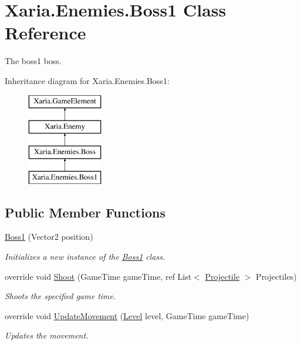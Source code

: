 \hypertarget{classXaria_1_1Enemies_1_1Boss1}{}\section{Xaria.\+Enemies.\+Boss1 Class Reference}
\label{classXaria_1_1Enemies_1_1Boss1}


The boss1 boss.  


Inheritance diagram for Xaria.\+Enemies.\+Boss1\+:\begin{figure}[H]
\begin{center}
\leavevmode
\includegraphics[height=4.000000cm]{classXaria_1_1Enemies_1_1Boss1}
\end{center}
\end{figure}
\subsection*{Public Member Functions}
\begin{DoxyCompactItemize}
\item 
\hyperlink{classXaria_1_1Enemies_1_1Boss1_a759929946aa105ff64f584b2d265db2b}{Boss1} (Vector2 position)
\begin{DoxyCompactList}\small\item\em Initializes a new instance of the \hyperlink{classXaria_1_1Enemies_1_1Boss1}{Boss1} class. \end{DoxyCompactList}\item 
override void \hyperlink{classXaria_1_1Enemies_1_1Boss1_a10fd351c6577ca1e85ec2396d421c313}{Shoot} (Game\+Time game\+Time, ref List$<$ \hyperlink{classXaria_1_1Projectile}{Projectile} $>$ Projectiles)
\begin{DoxyCompactList}\small\item\em Shoots the specified game time. \end{DoxyCompactList}\item 
override void \hyperlink{classXaria_1_1Enemies_1_1Boss1_aed5d8f9843c47b9022104ea2de498830}{Update\+Movement} (\hyperlink{classXaria_1_1Level}{Level} level, Game\+Time game\+Time)
\begin{DoxyCompactList}\small\item\em Updates the movement. \end{DoxyCompactList}\end{DoxyCompactItemize}
